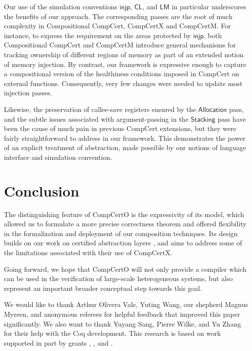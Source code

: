 \documentclass[sigplan,screen]{acmart}
\newcommand{\kw}[1]{\ensuremath{ \mathsf{#1} }}
\newcommand{\cc}[2]{{ \kw{#1#2} }}
\begin{document}
Our use of the simulation conventions
\kw{injp}, $\cc{C}{L}$, and $\cc{L}{M}$
in particular
underscores the benefits of our approach.
The corresponding passes are the root of
much complexity
in Compositional CompCert, CompCertX and CompCertM.
For instance,
to express the requirement on
the areas protected by \kw{injp},
both Compositional CompCert and CompCertM
introduce general mechanisms for tracking ownership of
different regions of memory
as part of an extended notion of memory injection.
By contrast,
our framework is expressive enough to capture
a compositional version of the healthiness conditions
imposed in CompCert on external functions.
Consequently,
very few changes were needed to update most injection passes.

Likewise, the preservation of callee-save registers
ensured by the \kw{Allocation} pass,
and the subtle issues associated with argument-passing
in the \kw{Stacking} pass
have been the cause of much pain
in previous CompCert extensions,
but they were fairly straightforward to address
in our framework.
This
demonstrates the power of
an explicit treatment of abstraction,
made possible
by our notions of language interface and simulation convention.



\section{Conclusion} \label{sec:concl} %

The distinguishing feature of CompCertO
is the expressivity of its model,
which allowed us to formulate a more precise correctness theorem
and offered flexibility
in the formalization and deployment of
our composition techniques.
Its design builds on our work on
certified abstraction layers \cite{popl15,rbgs-cal},
and aims to address some of the limitations
associated with their use of CompCertX.

Going forward,
we hope that CompCertO will not only
provide a compiler
which can be used in the verification of
large-scale heterogeneous systems,
but also represent an important broader conceptual step
towards this goal.


\begin{acks}
We would like to thank Arthur Olivera Vale,
Yuting Wang, our shepherd Magnus Myreen,
and anonymous referees 
for helpful feedback that
improved this paper significantly. We also want to thank
Yuyang Sang, Pierre Wilke, and Yu Zhang
for their help with the Coq development.
This research is based on work supported in part by
 grants
,
, and
.
\end{acks}
\end{document}
